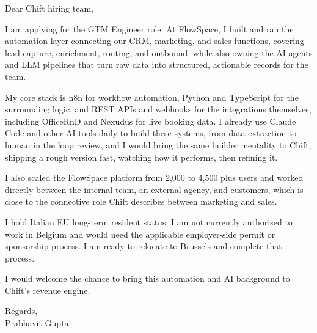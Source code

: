 \documentclass[a4paper,11pt]{article}
\begin{document}
Dear Chift hiring team,

I am applying for the GTM Engineer role. At FlowSpace, I built and ran the automation layer connecting our CRM, marketing, and sales functions, covering lead capture, enrichment, routing, and outbound, while also owning the AI agents and LLM pipelines that turn raw data into structured, actionable records for the team.

My core stack is n8n for workflow automation, Python and TypeScript for the surrounding logic, and REST APIs and webhooks for the integrations themselves, including OfficeRnD and Nexudus for live booking data. I already use Claude Code and other AI tools daily to build these systems, from data extraction to human in the loop review, and I would bring the same builder mentality to Chift, shipping a rough version fast, watching how it performs, then refining it.

I also scaled the FlowSpace platform from 2,000 to 4,500 plus users and worked directly between the internal team, an external agency, and customers, which is close to the connective role Chift describes between marketing and sales.

I hold Italian EU long-term resident status. I am not currently authorised to work in Belgium and would need the applicable employer-side permit or sponsorship process. I am ready to relocate to Brussels and complete that process.

I would welcome the chance to bring this automation and AI background to Chift's revenue engine.

Regards,\\
Prabhavit Gupta
\end{document}
